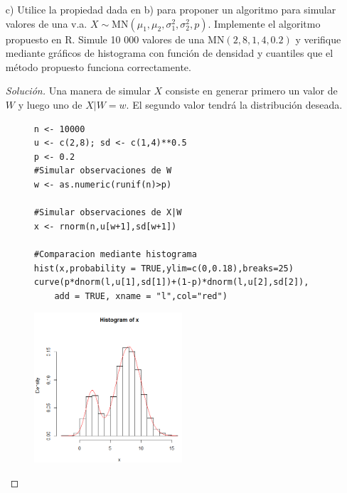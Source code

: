 \documentclass[11pt]{article}
\renewcommand{\=}[1]{\stackrel{#1}{=}} %
\newenvironment{sol}
{\begin{proof}[Solución]}
	{\end{proof}}
\theoremstyle{definition}
\theoremstyle{remark}
\begin{document}
\begin{itemize}
\begin{sol}
		Nos interesa calcular $f_X$, la densidad marginal de $X$, por lo que usamos la regla de probabilidad total con la partición dada por los valores de $W$:
		\begin{eqnarray}
		f_X(x) &=& f_{XW}(x,1) + f_{XW}(x,0)\nonumber\\
		&\stackrel{\mbox{Regla del producto}}{=}& f_W(1)f_{X|W}(x|1) + f_W(0)f_{X|W}(x|0) \nonumber\\
		&\stackrel{\mbox{por (6) y (7)}}{=}& p\phi_1 + (1-p)\phi_2\nonumber\\
		&=& p\phi(x|\mu_1,\sigma_1^2)+(1-p)\phi(x|\mu_2,\sigma_2^2)
		\end{eqnarray}
		Concluimos que $X \sim \text{MN}(\mu_1,\mu_2,\sigma_1^2,\sigma_2^2,p)$.
	\end{sol}
	\item[c)] Utilice la propiedad dada en b) para proponer un algoritmo para simular valores de una v.a. $X \sim \text{MN}(\mu_1,\mu_2,\sigma_1^2,\sigma_2^2,p)$. Implemente el algoritmo propuesto en R. Simule 10 000 valores de una $\text{MN}(2,8,1,4,0.2)$ y verifique mediante gráficos de histograma con función de densidad y cuantiles que el método propuesto funciona correctamente.
	\begin{sol}
		Una manera de simular $X$ consiste en generar primero un valor de $W$ y luego uno de $X|W=w$. El segundo valor tendrá la distribución deseada.
	
	\begin{figure}[h]
		\hspace*{0.9cm}\begin{minipage}{10.3cm}
{
	\begin{lstlisting}[style=myRstyle, caption={Verificación mediante histogramas / MN.}]
n <- 10000
u <- c(2,8); sd <- c(1,4)**0.5
p <- 0.2
#Simular observaciones de W
w <- as.numeric(runif(n)>p)

#Simular observaciones de X|W
x <- rnorm(n,u[w+1],sd[w+1])

#Comparacion mediante histograma
hist(x,probability = TRUE,ylim=c(0,0.18),breaks=25)
curve(p*dnorm(l,u[1],sd[1])+(1-p)*dnorm(l,u[2],sd[2]),
	add = TRUE, xname = "l",col="red")
	\end{lstlisting}
}			
		\end{minipage}
		\begin{minipage}{6cm}
			\includegraphics[width=5.5cm]{histr}
		\end{minipage}
	\end{figure}


\end{sol}
\end{itemize}
\end{document}
